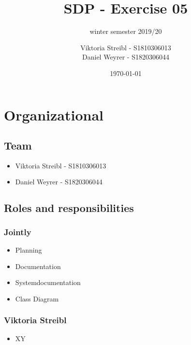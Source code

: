 

\graphicspath{{./}}



\title{SDP - Exercise 05} %
\subtitle{winter semester 2019/20} %
\author{
Viktoria Streibl - S1810306013\\
  Daniel Weyrer - S1820306044
} %
\date{\today} %

\maketitle %

\newpage
\tableofcontents %
\newpage


\section{Organizational}
\subsection{Team}
\begin{itemize}
	\item Viktoria 	Streibl 		- 	S1810306013
	\item Daniel 	Weyrer		-	S1820306044
\end{itemize}

\subsection{Roles and responsibilities}
\subsubsection{Jointly}
\begin{itemize}
	\item Planning
	\item Documentation
	\item Systemdocumentation
	\item Class Diagram
\end{itemize}

\subsubsection{Viktoria Streibl}
\begin{itemize}
	\item XY
\end{itemize}

